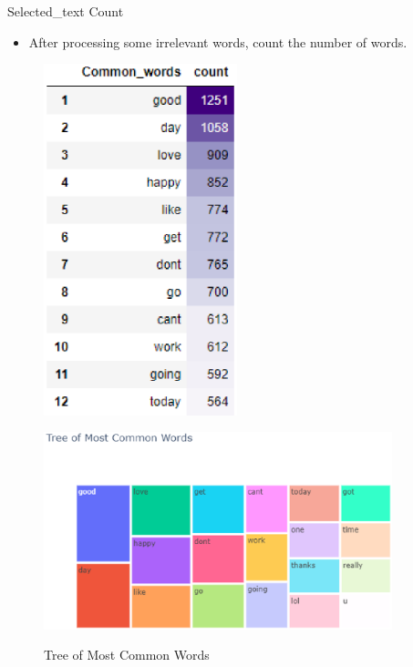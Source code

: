 \documentclass[
 size=14pt,
 paper=smartboard,  %
 mode=present, 		%
 display=slides, 	%
 style=tuliplab,  	%
 pauseslide,
 fleqn,leqno]{powerdot}
\begin{document}
\begin{slide}[toc=,bm=]{Selected_text Count}
  \begin{itemize}
    \item After processing some irrelevant words, count the number of words.
  \end{itemize}
  \begin{figure}[htbp]
    \centering
    \begin{minipage}[t]{0.48\textwidth}
      \centering
      \includegraphics[width=0.5\textwidth]{figures//st_count_new_n.eps}\\
      \vspace{-1.4em}
      \caption{Number Count}
    \end{minipage}
    \begin{minipage}[t]{0.48\textwidth}
      \centering
      \includegraphics[width=0.9\textwidth]{figures//st_count_new.eps}\\
      \vspace{-1.4em}
      \caption{Tree of Most Common Words}
    \end{minipage}
  \end{figure}
\end{slide}
\end{document}
